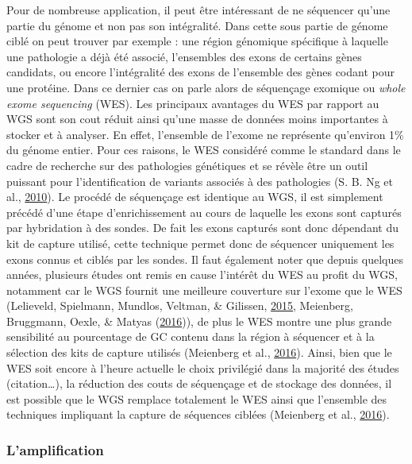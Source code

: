 \documentclass[12pt,twoside]{reedthesis}
\theoremstyle{definition}
\theoremstyle{definition}
\theoremstyle{remark}
\begin{document}
  Pour de nombreuse application, il peut être intéressant de ne séquencer
  qu'une partie du génome et non pas son intégralité. Dans cette sous
  partie de génome ciblé on peut trouver par exemple : une région
  génomique spécifique à laquelle une pathologie a déjà été associé,
  l'ensembles des exons de certains gènes candidats, ou encore
  l'intégralité des exons de l'ensemble des gènes codant pour une
  protéine. Dans ce dernier cas on parle alors de séquençage exomique ou
  \emph{whole exome sequencing} (WES). Les principaux avantages du WES par
  rapport au WGS sont son cout réduit ainsi qu'une masse de données moins
  importantes à stocker et à analyser. En effet, l'ensemble de l'exome ne
  représente qu'environ 1\% du génome entier. Pour ces raisons, le WES
  considéré comme le standard dans le cadre de recherche sur des
  pathologies génétiques et se révèle être un outil puissant pour
  l'identification de variants associés à des pathologies (S. B. Ng et
  al., \protect\hyperlink{ref-Ng2010}{2010}). Le procédé de séquençage est
  identique au WGS, il est simplement précédé d'une étape d'enrichissement
  au cours de laquelle les exons sont capturés par hybridation à des
  sondes. De fait les exons capturés sont donc dépendant du kit de capture
  utilisé, cette technique permet donc de séquencer uniquement les exons
  connus et ciblés par les sondes. Il faut également noter que depuis
  quelques années, plusieurs études ont remis en cause l'intérêt du WES au
  profit du WGS, notamment car le WGS fournit une meilleure couverture sur
  l'exome que le WES (Lelieveld, Spielmann, Mundlos, Veltman, \& Gilissen,
  \protect\hyperlink{ref-Lelieveld2015}{2015}, Meienberg, Bruggmann,
  Oexle, \& Matyas (\protect\hyperlink{ref-Meienberg2016}{2016})), de plus
  le WES montre une plus grande sensibilité au pourcentage de GC contenu
  dans la région à séquencer et à la sélection des kits de capture
  utilisés (Meienberg et al.,
  \protect\hyperlink{ref-Meienberg2016}{2016}). Ainsi, bien que le WES
  soit encore à l'heure actuelle le choix privilégié dans la majorité des
  études (citation\ldots{}), la réduction des couts de séquençage et de
  stockage des données, il est possible que le WGS remplace totalement le
  WES ainsi que l'ensemble des techniques impliquant la capture de
  séquences ciblées (Meienberg et al.,
  \protect\hyperlink{ref-Meienberg2016}{2016}).
  
  \subsubsection{L'amplification}\label{lamplification}
  
\end{document}
